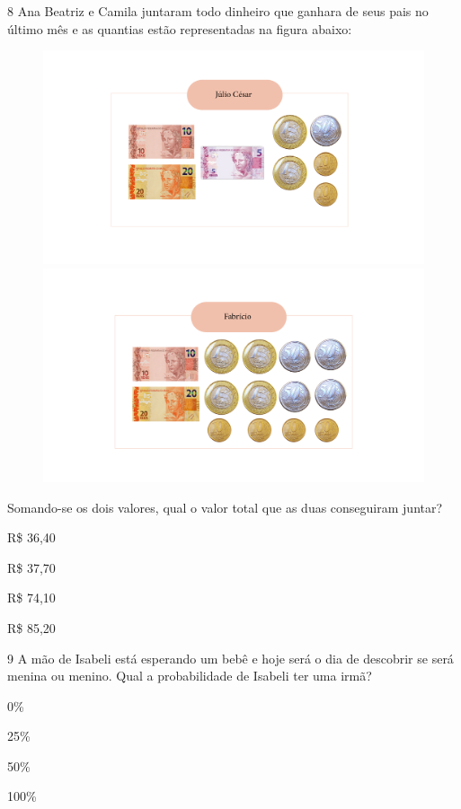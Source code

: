 \num{8} Ana Beatriz e Camila juntaram todo dinheiro que ganhara de seus
pais no último mês e as quantias estão representadas na figura abaixo:

\begin{figure}[htpb!]
\includegraphics[width=.5\textwidth]{../ilustracoes/MAT5/SAEB_5ANO_MAT_figura114a.png}
\includegraphics[width=.5\textwidth]{../ilustracoes/MAT5/SAEB_5ANO_MAT_figura114b.png}
\end{figure}

Somando-se os dois valores, qual o valor total que as duas conseguiram
juntar?

\begin{escolha}
\item
  R\$ 36,40
\item
  R\$ 37,70
\item
  R\$ 74,10
\item
  R\$ 85,20
\end{escolha}


\num{9} A mão de Isabeli está esperando um bebê e hoje será o dia de
descobrir se será menina ou menino. Qual a probabilidade de Isabeli ter
uma irmã?

\begin{escolha}
\item
  0\%
\item
  25\%
\item
  50\%
\item
  100\%
\end{escolha}

